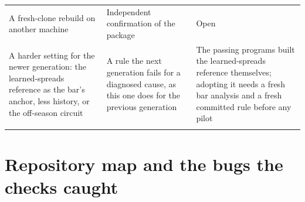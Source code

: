\documentclass[11pt,letterpaper]{article}
\begin{document}
\begin{small}
\begin{longtable}{>{\raggedright\arraybackslash}p{}>{\raggedright\arraybackslash}p{}>{\raggedright\arraybackslash}p{}}
A fresh-clone rebuild on another machine & Independent confirmation of the package & Open \\ \addlinespace[2pt]
A harder setting for the newer generation: the learned-spreads reference as the bar's anchor, less history, or the off-season circuit & A rule the next generation fails for a diagnosed cause, as this one does for the previous generation & The passing programs built the learned-spreads reference themselves; adopting it needs a fresh bar analysis and a fresh committed rule before any pilot \\ \addlinespace[2pt]
\end{longtable}
\end{small}

\appendix
\section{Repository map and the bugs the checks caught}
\end{document}
